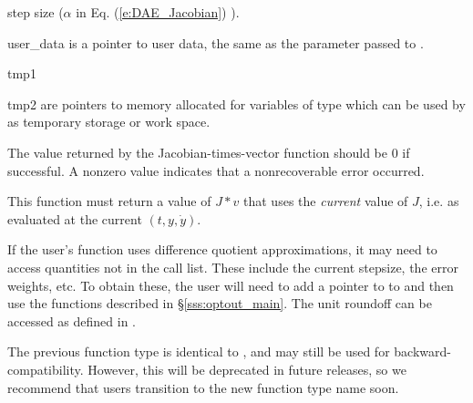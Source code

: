 {{\begin{args}
    step size ($\alpha$ in Eq. (\ref{e:DAE_Jacobian}) ).
  \item[user\_data]
    is a pointer to user data, the same as the 
    parameter passed to .
  \item[tmp1]
  \item[tmp2]
    are pointers to memory allocated for variables of type  which
    can be used by  as temporary storage or work space.
  \end{args}
}
{
  The value returned by the Jacobian-times-vector function should be 0 if
  successful.  A nonzero value indicates that a nonrecoverable error occurred.
}
{
  This function must return a value of $J*v$ that uses the {\it current}
  value of $J$, i.e. as evaluated at the current $(t,y,\dot{y})$.

  If the user's  function uses difference quotient
  approximations, it may need to access quantities not in the call
  list. These include the current stepsize, the error weights, etc.
  To obtain these, the user will need to add a pointer to 
  to  and then use the  functions described in
  \S\ref{sss:optout_main}. The unit roundoff can be accessed as
   defined in .

  The previous function type  is identical to
  , and may still be used for backward-compatibility.
  However, this will be deprecated in future releases, so we recommend
  that users transition to the new function type name soon.
}
}
